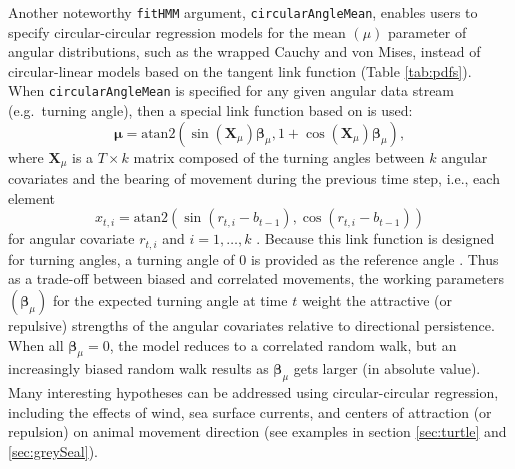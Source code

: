 \documentclass[12pt]{article}\usepackage[]{graphicx}\usepackage[]{color}
\begin{document}
Another noteworthy \verb|fitHMM| argument, \verb|circularAngleMean|, enables users to specify circular-circular regression models for the mean $(\mu)$ parameter of angular distributions, such as the wrapped Cauchy and von Mises, instead of circular-linear models based on the tangent link function (Table \ref{tab:pdfs}). When \verb|circularAngleMean| is specified for any given angular data stream (e.g.\ turning angle), then a special link function based on \cite{DuchesneEtAl2015} is used:
\begin{equation}
  {\boldsymbol \mu}=\text{atan2}(\sin({\mathbf X}_\mu){\boldsymbol \beta}_\mu,1+\cos({\mathbf X}_\mu){\boldsymbol \beta}_\mu),
  \label{eq:circ}
\end{equation}
where ${\mathbf X}_\mu$ is a $T \times k$ matrix composed of the turning angles between $k$ angular covariates and the bearing of movement during the previous time step, i.e., each element 
\begin{equation}
x_{t,i}=\text{atan2}(\sin(r_{t,i}-b_{t-1}),\cos(r_{t,i}-b_{t-1})) 
  \label{eq:angleCov}
\end{equation}
for angular covariate $r_{t,i}$ and $i=1,\ldots,k$%
. Because this link function is designed for turning angles, a turning angle of 0 is provided as the reference angle%
.  Thus as a trade-off between biased and correlated movements, the working parameters $({\boldsymbol \beta}_\mu)$ for the expected turning angle at time $t$ weight the attractive (or repulsive) strengths of the angular covariates relative to directional persistence.  When all ${\boldsymbol \beta}_\mu=0$, the model reduces to a correlated random walk, but an increasingly biased random walk results as ${\boldsymbol \beta}_\mu$ gets larger (in absolute value). Many interesting hypotheses can be addressed using circular-circular regression, including the effects of wind, sea surface currents, and centers of attraction (or repulsion) on animal movement direction (see examples in section \ref{sec:turtle} and \ref{sec:greySeal}).
\end{document}

